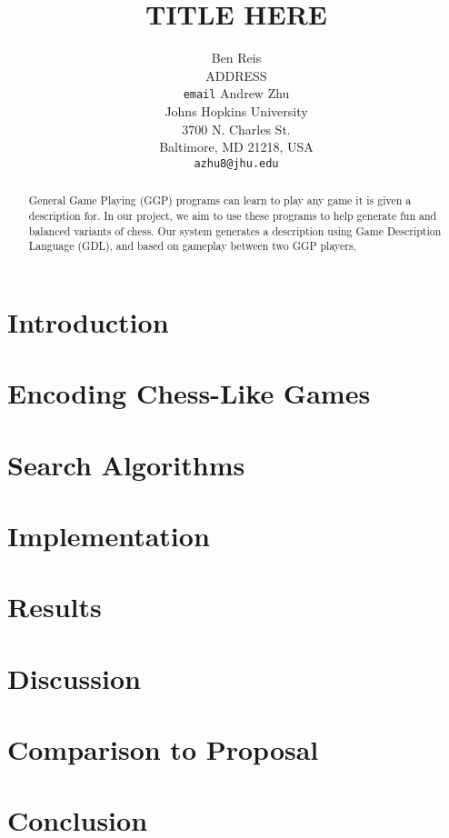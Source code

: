 \documentclass[11pt,letterpaper]{article}
\title{TITLE HERE}
\author{Ben Reis \\
  ADDRESS \\
  {\tt email}
  \And
  Andrew Zhu \\
  Johns Hopkins University \\
  3700 N. Charles St. \\
  Baltimore, MD 21218, USA\\
  {\tt azhu8@jhu.edu}}
\date{}
\begin{document}
\maketitle
\begin{abstract}
General Game Playing (GGP) programs can learn to play any game it is given a description for. In our project, we aim to use these programs to help generate fun and balanced variants of chess. Our system generates a description using Game Description Language (GDL), and based on gameplay between two GGP players,  
\end{abstract}

\section{Introduction}


\section{Encoding Chess-Like Games}

\section{Search Algorithms}

\section{Implementation}

\section{Results}

\section{Discussion}


\section{Comparison to Proposal}


\section{Conclusion}
\end{document}
